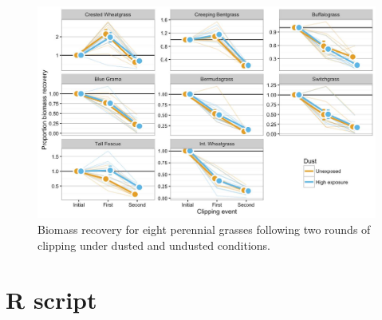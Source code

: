 \documentclass[]{scrartcl}
\begin{document}
\begin{figure}[!h]
  \includegraphics[width=1\textwidth]{figures/grassrecovery.jpg}
  \caption{Biomass recovery for eight perennial grasses following two rounds of clipping under dusted and undusted conditions. }
\end{figure}

\clearpage

\hypertarget{r-script}{%
\section{R script}\label{r-script}}
\end{document}
